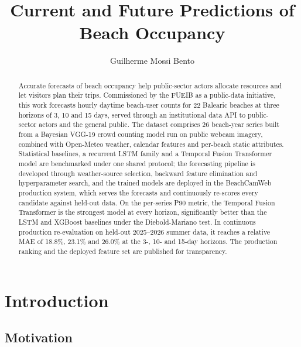 \documentclass[twocolumn,twoside,a4paper,10pt]{IEEEtran}
\title{Current and Future Predictions of Beach Occupancy}
\author{Guilherme Mossi Bento}
\begin{document}

\maketitle




\begin{abstract}
\noindent Accurate forecasts of beach occupancy help public-sector actors allocate resources and let visitors plan their trips. Commissioned by the FUEIB as a public-data initiative, this work forecasts hourly daytime beach-user counts for 22 Balearic beaches at three horizons of 3, 10 and 15 days, served through an institutional data API to public-sector actors and the general public. The dataset comprises 26 beach-year series built from a Bayesian VGG-19 crowd counting model run on public webcam imagery, combined with Open-Meteo weather, calendar features and per-beach static attributes. Statistical baselines, a recurrent LSTM family and a Temporal Fusion Transformer model are benchmarked under one shared protocol; the forecasting pipeline is developed through weather-source selection, backward feature elimination and hyperparameter search, and the trained models are deployed in the BeachCamWeb production system, which serves the forecasts and continuously re-scores every candidate against held-out data. On the per-series P90 metric, the Temporal Fusion Transformer is the strongest model at every horizon, significantly better than the LSTM and XGBoost baselines under the Diebold-Mariano test. In continuous production re-evaluation on held-out 2025--2026 summer data, it reaches a relative MAE of 18.8\%, 23.1\% and 26.0\% at the 3-, 10- and 15-day horizons. The production ranking and the deployed feature set are published for transparency.
\end{abstract}



\section{Introduction}

\subsection{Motivation}
\end{document}
